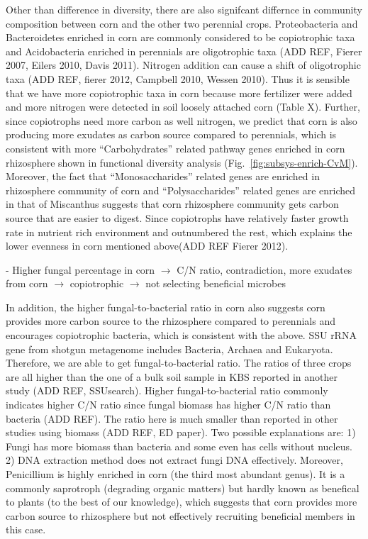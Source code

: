 \documentclass[12pt]{article}
\begin{document}
Other than difference in diversity, there are also signifcant differnce in community composition between corn and the other two perennial crops. Proteobacteria and Bacteroidetes enriched in corn are commonly considered to be copiotrophic taxa and Acidobacteria enriched in perennials are oligotrophic taxa (ADD REF, Fierer 2007, Eilers 2010, Davis 2011). Nitrogen addition can cause a shift of oligotrophic taxa (ADD REF, fierer 2012, Campbell 2010, Wessen 2010). Thus it is sensible that we have more copiotrophic taxa in corn because more fertilizer were added and more nitrogen were detected in soil loosely attached corn (Table X). Further, since copiotrophs need more carbon as well nitrogen, we predict that corn is also producing more exudates as carbon source compared to perennials, which is consistent with more ``Carbohydrates'' related pathway genes enriched in corn rhizosphere shown in functional diversity analysis (Fig.~\ref{fig:subsys-enrich-CvM}). Moreover, the fact that ``Monosaccharides'' related genes are enriched in rhizosphere community of corn and ``Polysaccharides'' related genes are enriched in that of Miscanthus suggests that corn rhizosphere community gets carbon source that are easier to digest. Since copiotrophs have relatively faster growth rate in nutrient rich environment and outnumbered the rest, which explains the lower evenness in corn mentioned above(ADD REF Fierer 2012).

- Higher fungal percentage in corn $\rightarrow$ C/N ratio, contradiction, more exudates from corn $\rightarrow$ copiotrophic $\rightarrow$ not selecting beneficial microbes

In addition, the higher fungal-to-bacterial ratio in corn also suggests corn provides more carbon source to the rhizosphere compared to perennials and encourages copiotrophic bacteria, which is consistent with the above. SSU rRNA gene from shotgun metagenome includes Bacteria, Archaea and Eukaryota. Therefore, we are able to get fungal-to-bacterial ratio. The ratios of three crops are all higher than the one of a bulk soil sample in KBS reported in another study (ADD REF, SSUsearch). Higher fungal-to-bacterial ratio commonly indicates higher C/N ratio since fungal biomass has higher C/N ratio than bacteria (ADD REF). The ratio here is much smaller than reported in other studies using biomass (ADD REF, ED paper). Two possible explanations are: 1) Fungi has more biomass than bacteria and some even has cells without nucleus. 2) DNA extraction method does not extract fungi DNA effectively. Moreover, Penicillium is highly enriched in corn (the third most abundant genus). It is a commonly saprotroph (degrading organic matters) but hardly known as benefical to plants (to the best of our knowledge), which suggests that corn provides more carbon source to rhizosphere but not effectively recruiting beneficial members in this case.
\end{document}
